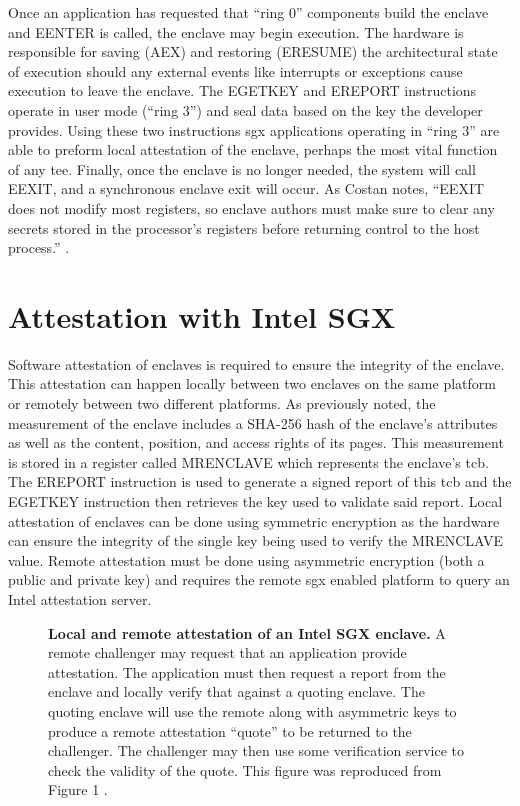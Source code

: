 Once an application has requested that ``ring 0'' components build the enclave and EENTER is called, the enclave may begin execution. The hardware is responsible for saving (AEX) and restoring (ERESUME) the architectural state of execution should any external events like interrupts or exceptions cause execution to leave the enclave. The EGETKEY and EREPORT instructions operate in user mode (``ring 3'') and seal data based on the key the developer provides. Using these two instructions \gls{sgx} applications operating in ``ring 3'' are able to preform local attestation of the enclave, perhaps the most vital function of any \gls{tee}. Finally, once the enclave is no longer needed, the system will call EEXIT, and a synchronous enclave exit will occur. As Costan notes, ``EEXIT does not modify most registers, so enclave authors must make sure to clear any secrets stored in the processor’s registers before returning control to the host process.'' \cite{Costan2016}.

\section{Attestation with Intel SGX}
Software attestation of enclaves is required to ensure the integrity of the enclave. This attestation can happen locally between two enclaves on the same platform or remotely between two different platforms. As previously noted, the measurement of the enclave includes a SHA-256 hash of the enclave's attributes as well as the content, position, and access rights of its pages. This measurement is stored in a register called MRENCLAVE which represents the enclave's \gls{tcb}. The EREPORT instruction is used to generate a signed report of this \gls{tcb} and the EGETKEY instruction then retrieves the key used to validate said report. Local attestation of enclaves can be done using symmetric encryption as the hardware can ensure the integrity of the single key being used to verify the MRENCLAVE value. Remote attestation must be done using asymmetric encryption (both a public and private key) and requires the remote \gls{sgx} enabled platform to query an Intel attestation server.

\begin{figure}[hb]
\centering

\caption[Intel SGX Attestation]{\textbf{Local and remote attestation of an Intel SGX enclave.} A remote challenger may request that an application provide attestation. The application must then request a report from the enclave and locally verify that against a quoting enclave. The quoting enclave will use the remote along with asymmetric keys to produce a remote attestation ``quote'' to be returned to the challenger. The challenger may then use some verification service to check the validity of the quote. This figure was reproduced from Figure 1 \cite{johnson2016intel}.}
\label{fig:sgx-attest}
\end{figure}

